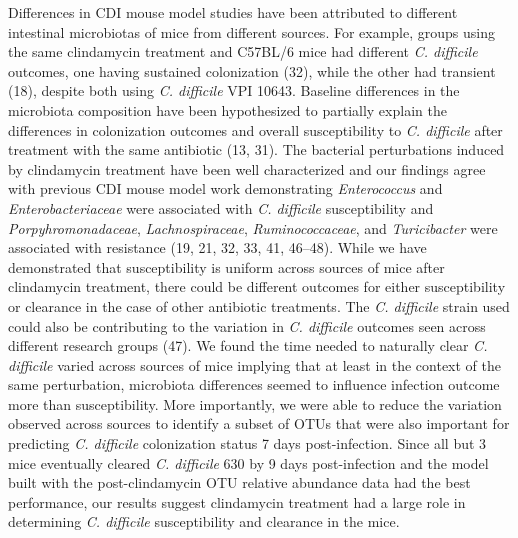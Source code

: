 \documentclass[11pt,]{article}
\begin{document}
Differences in CDI mouse model studies have been attributed to different
intestinal microbiotas of mice from different sources. For example,
groups using the same clindamycin treatment and C57BL/6 mice had
different \emph{C. difficile} outcomes, one having sustained
colonization (32), while the other had transient (18), despite both
using \emph{C. difficile} VPI 10643. Baseline differences in the
microbiota composition have been hypothesized to partially explain the
differences in colonization outcomes and overall susceptibility to
\emph{C. difficile} after treatment with the same antibiotic (13, 31).
The bacterial perturbations induced by clindamycin treatment have been
well characterized and our findings agree with previous CDI mouse model
work demonstrating \emph{Enterococcus} and \emph{Enterobacteriaceae}
were associated with \emph{C. difficile} susceptibility and
\emph{Porpyhromonadaceae}, \emph{Lachnospiraceae},
\emph{Ruminococcaceae}, and \emph{Turicibacter} were associated with
resistance (19, 21, 32, 33, 41, 46--48). While we have demonstrated that
susceptibility is uniform across sources of mice after clindamycin
treatment, there could be different outcomes for either susceptibility
or clearance in the case of other antibiotic treatments. The \emph{C.
difficile} strain used could also be contributing to the variation in
\emph{C. difficile} outcomes seen across different research groups (47).
We found the time needed to naturally clear \emph{C. difficile} varied
across sources of mice implying that at least in the context of the same
perturbation, microbiota differences seemed to influence infection
outcome more than susceptibility. More importantly, we were able to
reduce the variation observed across sources to identify a subset of
OTUs that were also important for predicting \emph{C. difficile}
colonization status 7 days post-infection. Since all but 3 mice
eventually cleared \emph{C. difficile} 630 by 9 days post-infection and
the model built with the post-clindamycin OTU relative abundance data
had the best performance, our results suggest clindamycin treatment had
a large role in determining \emph{C. difficile} susceptibility and
clearance in the mice.
\end{document}
